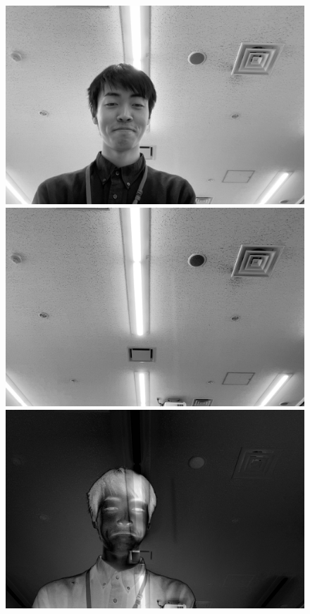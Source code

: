 \begin{figure}[H]
\begin{minipage}[b]{.49\textwidth}
\begin{minipage}[b]{.3\textwidth}
            \includegraphics[keepaspectratio,width=\textwidth]{../../05_UnderstandingImages/fig1_g.jpg}
        \end{minipage}
        \begin{minipage}[b]{.3\textwidth}
            \centering
            \includegraphics[keepaspectratio,width=\textwidth]{../../05_UnderstandingImages/fig2_g.jpg}
        \end{minipage}
        \begin{minipage}[b]{.3\textwidth}
            \centering
            \includegraphics[keepaspectratio,width=\textwidth]{../../Figures/05_60.png}

\end{minipage}
\end{minipage}
\end{figure}
